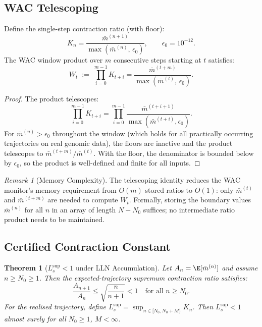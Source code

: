 \documentclass[12pt,letterpaper]{article}
\theoremstyle{definition}
\theoremstyle{plain}
\newtheorem{theorem}{Theorem}[section]
\theoremstyle{remark}
\newtheorem*{remark}{Remark}
\newcommand{\mbar}{\bar{m}}
\newcommand{\Lsup}{L_s^{\sup}}
\begin{document}
\subsection{WAC Telescoping}

\begin{proposition}
\label{prop:telescope}
Define the single-step contraction ratio (with floor):
\[
  K_n = \frac{\mbar^{(n+1)}}{\max(\mbar^{(n)},\,\epsilon_0)},
  \qquad \epsilon_0 = 10^{-12}.
\]
The WAC window product over $m$ consecutive steps starting at $t$ satisfies:
\[
  W_t \;:=\; \prod_{i=0}^{m-1} K_{t+i}
  = \frac{\mbar^{(t+m)}}{\max(\mbar^{(t)},\,\epsilon_0)}.
\]
\end{proposition}

\begin{proof}
The product telescopes:
\[
  \prod_{i=0}^{m-1} K_{t+i}
    = \prod_{i=0}^{m-1}\frac{\mbar^{(t+i+1)}}{\max(\mbar^{(t+i)},\epsilon_0)}.
\]
For $\mbar^{(n)} > \epsilon_0$ throughout the window (which holds for all
practically occurring trajectories on real genomic data), the floors are
inactive and the product telescopes to $\mbar^{(t+m)}/\mbar^{(t)}$.
With the floor, the denominator is bounded below by $\epsilon_0$, so the
product is well-defined and finite for all inputs.
\end{proof}

\begin{remark}[Memory Complexity]
The telescoping identity reduces the WAC monitor's memory requirement
from $O(m)$ stored ratios to $O(1)$: only $\mbar^{(t)}$ and
$\mbar^{(t+m)}$ are needed to compute $W_t$.  Formally, storing the
boundary values $\mbar^{(n)}$ for all $n$ in an array of length $N-N_0$
suffices; no intermediate ratio product needs to be maintained.
\end{remark}

\subsection{Certified Contraction Constant}

\begin{theorem}[$\Lsup < 1$ under LLN Accumulation]
\label{thm:lsup}
Let $A_n = \E[\mbar^{(n)}]$ and assume $n \ge N_0 \ge 1$.  Then the
expected-trajectory supremum contraction ratio satisfies:
\[
  \frac{A_{n+1}}{A_n}
  \le \sqrt{\frac{n}{n+1}}
  < 1
  \quad \text{for all } n \ge N_0.
\]
For the realised trajectory, define
$\Lsup = \sup_{n \in [N_0, N_0+M)} K_n$.
Then $\Lsup < 1$ almost surely for all $N_0 \ge 1$, $M < \infty$.
\end{theorem}
\end{document}
